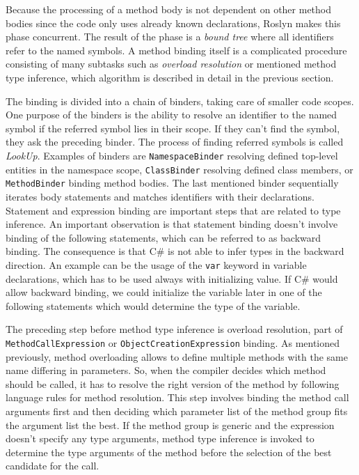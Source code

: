 Because the processing of a method body is not dependent on other method bodies since the code only uses already known declarations, Roslyn makes this phase concurrent. 
The result of the phase is a \emph{bound tree} where all identifiers refer to the named symbols. 
A method binding itself is a complicated procedure consisting of many subtasks such as \emph{overload resolution} or mentioned method type inference, which algorithm is described in detail in the previous section.
\par
The binding is divided into a chain of binders, taking care of smaller code scopes. 
One purpose of the binders is the ability to resolve an identifier to the named symbol if the referred symbol lies in their scope. 
If they can’t find the symbol, they ask the preceding binder. 
The process of finding referred symbols is called \emph{LookUp}. 
Examples of binders are \texttt{NamespaceBinder} resolving defined top-level entities in the namespace scope, \texttt{ClassBinder} resolving defined class members, or \texttt{MethodBinder} binding method bodies. 
The last mentioned binder sequentially iterates body statements and matches identifiers with their declarations. 
Statement and expression binding are important steps that are related to type inference.
An important observation is that statement binding doesn’t involve binding of the following statements, which can be referred to as backward binding. 
The consequence is that C\# is not able to infer types in the backward direction. 
An example can be the usage of the \texttt{var} keyword in variable declarations, which has to be used always with initializing value. 
If C\# would allow backward binding, we could initialize the variable later in one of the following statements which would determine the type of the variable.
\par
The preceding step before method type inference is overload resolution, part of \texttt{MethodCallExpression} or \texttt{ObjectCreationExpression} binding. 
As mentioned previously, method overloading allows to define multiple methods with the same name differing in parameters. 
So, when the compiler decides which method should be called, it has to resolve the right version of the method by following language rules for method resolution. 
This step involves binding the method call arguments first and then deciding which parameter list of the method group fits the argument list the best. 
If the method group is generic and the expression doesn’t specify any type arguments, method type inference is invoked to determine the type arguments of the method before the selection of the best candidate for the call.
